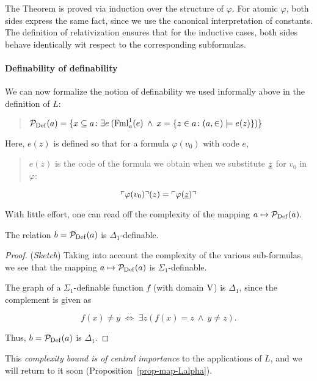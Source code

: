 The Theorem is proved via induction over the structure of $\varphi$. For atomic $\varphi$, both sides express the same fact, since we use the canonical interpretation of constants. The definition of relativization ensures that for the inductive cases, both sides behave identically wit respect to the corresponding subformulas.

\paragraph{Definability of definability}

We can now formalize the notion of definability we used informally above in the definition of $L$:

\begin{quote}
$\mathcal{P}_{\operatorname{Def}}(a) = \{ x \subseteq a \colon \exists e \: (\operatorname{Fml}^1_a(e) \: \wedge \: x = \{z \in a\colon (a,\in) \models e(z)\})\}$
\end{quote}

Here, $e(z)$ is defined so that for a formula $\varphi(v_0)$ with code $e$,

\begin{quote}
$e(z)$ is the code of the formula we obtain when we substitute $\underline{z}$ for $v_0$ in $\varphi$:
\end{quote}
\begin{equation*}
\ulcorner \varphi(v_0) \urcorner(z) = \ulcorner \varphi(\underline{z}) \urcorner
\end{equation*}

With little effort, one can read off the complexity of the mapping $a \mapsto \mathcal{P}_{\operatorname{Def}}(a)$.

\begin{theorem}\label{thm-definability-pdef}The relation $b = \mathcal{P}_{\operatorname{Def}}(a)$ is $\Delta_1$-definable.

\end{theorem}\begin{proof}(\textit{Sketch}) Taking into account the complexity of the various sub-formulas, we see that the mapping $a \mapsto \mathcal{P}_{\operatorname{Def}}(a)$ is $\Sigma_1$-definable.

The graph of a $\Sigma_1$-definable function $f$ (with domain $\operatorname{V}$) is $\Delta_1$, since the complement is given as

\begin{equation}
f(x) \neq y \; \Leftrightarrow \; \exists z (f(x)=z \: \wedge \: y \neq z).
\end{equation}

Thus,  $b = \mathcal{P}_{\operatorname{Def}}(a)$ is $\Delta_1$.

\end{proof}This \textit{complexity bound is of central importance} to the applications of $L$, and we will return to it soon (Proposition~\ref{prop-map-Lalpha}).

